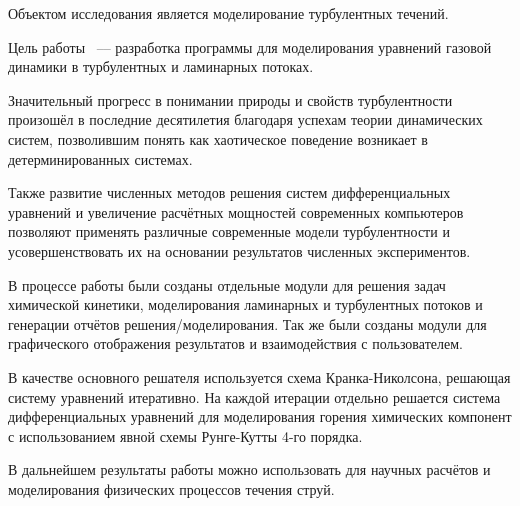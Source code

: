\abstract %


Объектом исследования является моделирование турбулентных течений.

Цель работы ~--– разработка программы для моделирования уравнений газовой динамики в турбулентных и ламинарных потоках.

Значительный прогресс в понимании природы и свойств турбулентности произошёл в последние десятилетия благодаря успехам теории динамических систем, позволившим понять как хаотическое поведение возникает в детерминированных системах.

Также развитие численных методов решения систем дифференциальных уравнений и увеличение расчётных мощностей современных компьютеров позволяют применять различные современные модели турбулентности и усовершенствовать их на основании результатов численных экспериментов.

В процессе работы были созданы отдельные модули для решения задач химической кинетики, моделирования ламинарных и турбулентных потоков и генерации отчётов решения/моделирования. Так же были созданы модули для графического отображения результатов и взаимодействия с пользователем.

В качестве основного решателя используется схема Кранка-Николсона, решающая систему уравнений итеративно. На каждой итерации отдельно решается система дифференциальных уравнений для моделирования горения химических компонент с использованием явной схемы Рунге-Кутты 4-го порядка.

В дальнейшем результаты работы можно использовать для научных расчётов и моделирования физических процессов течения струй.

